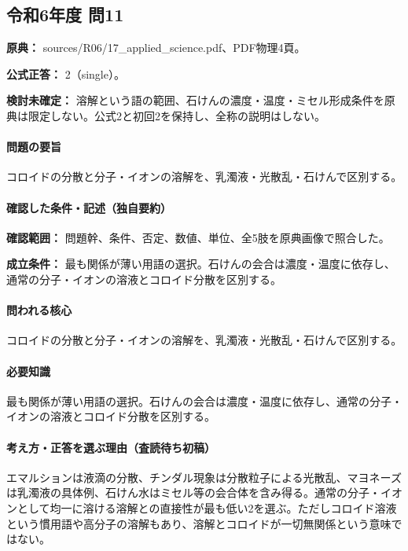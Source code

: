 \subsection{令和6年度 問11}
\label{q:r06-reg-applied-11}

\noindent\textbf{原典：} sources/R06/17\_applied\_science.pdf、PDF物理4頁。

\textbf{公式正答：} 2（single）。

\par\textbf{検討未確定：} 溶解という語の範囲、石けんの濃度・温度・ミセル形成条件を原典は限定しない。公式2と初回2を保持し、全称の説明はしない。

\paragraph{問題の要旨} コロイドの分散と分子・イオンの溶解を、乳濁液・光散乱・石けんで区別する。

\paragraph{確認した条件・記述（独自要約）}\mbox{}\par

\noindent\textbf{確認範囲：} 問題幹、条件、否定、数値、単位、全5肢を原典画像で照合した。\par

\noindent\textbf{成立条件：} 最も関係が薄い用語の選択。石けんの会合は濃度・温度に依存し、通常の分子・イオンの溶液とコロイド分散を区別する。\par

\paragraph{問われる核心} コロイドの分散と分子・イオンの溶解を、乳濁液・光散乱・石けんで区別する。

\paragraph{必要知識} 最も関係が薄い用語の選択。石けんの会合は濃度・温度に依存し、通常の分子・イオンの溶液とコロイド分散を区別する。

\paragraph{考え方・正答を選ぶ理由（査読待ち初稿）} エマルションは液滴の分散、チンダル現象は分散粒子による光散乱、マヨネーズは乳濁液の具体例、石けん水はミセル等の会合体を含み得る。通常の分子・イオンとして均一に溶ける溶解との直接性が最も低い2を選ぶ。ただしコロイド溶液という慣用語や高分子の溶解もあり、溶解とコロイドが一切無関係という意味ではない。

